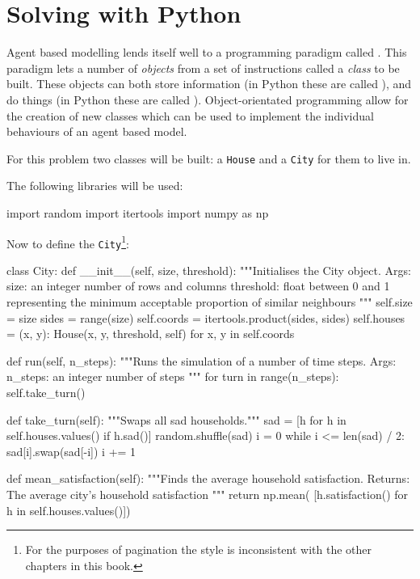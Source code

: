 \section{Solving with Python}\label{sec:agent_based_simulation_solving-with-python}

Agent based modelling lends itself well to a programming paradigm called
.
This paradigm lets a number of \textit{objects} from a set of instructions
called a \textit{class} to be built.
These objects can both store information (in Python these are called
\textit{}), and do things (in Python these are called
\textit{}).
Object-orientated programming allow for the creation of new
classes which can be
used to implement the individual behaviours of an agent based model.

For this problem two classes will be built: a
\texttt{House} and a \texttt{City} for them to live in.

The following libraries will be used:

\begin{pyin}
import random
import itertools
import numpy as np
\end{pyin}

Now to define the \texttt{City}\footnote{
For the purposes of pagination the style is inconsistent with the other
chapters in this book.
}:

\begin{pyin}
class City:
    def __init__(self, size, threshold):
        """Initialises the City object.
        Args:
            size: an integer number of rows and columns
            threshold: float between 0 and 1 representing the
            minimum acceptable proportion of similar neighbours
        """
        self.size = size
        sides = range(size)
        self.coords = itertools.product(sides, sides)
        self.houses = {
            (x, y): House(x, y, threshold, self)
            for x, y in self.coords}

    def run(self, n_steps):
        """Runs the simulation of a number of time steps.
        Args:
            n_steps: an integer number of steps
        """
        for turn in range(n_steps):
            self.take_turn()

    def take_turn(self):
        """Swaps all sad households."""
        sad = [h for h in self.houses.values() if h.sad()]
        random.shuffle(sad)
        i = 0
        while i <= len(sad) / 2:
            sad[i].swap(sad[-i])
            i += 1

    def mean_satisfaction(self):
        """Finds the average household satisfaction.
        Returns:
            The average city's household satisfaction
        """
        return np.mean(
            [h.satisfaction() for h in self.houses.values()])
\end{pyin}

